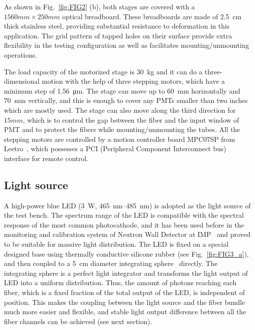 \documentclass{nst}
\begin{document}
As shown in Fig.~\ref{fig:FIG2} (b), both stages are covered with a $1560mm\times250mm$ optical breadboard. 
These breadboards are made of \SI{2.5}{cm} thick stainless steel, providing substantial resistance to deformation in this application. 
The grid pattern of tapped holes on their surface provide extra flexibility in the testing configuration as well as facilitates mounting/unmounting operations.

The load capacity of the motorized stage is \SI{30}{\kilo\gram} and it can do a three-dimensional motion with the help of three stepping motors, which have a minimum step of \SI{1.56}{\micro\meter}.
The stage can move up to \SI{60}{\milli\meter} horizontally and \SI{70}{\milli\meter} vertically, and this is enough to cover any PMTs smaller than two inches which are mostly used.
The stage can also move along the third direction for $15mm$, which is to control the gap between the fiber and the input window of PMT and to protect the fibers while mounting/unmounting the tubes.
All the stepping motors are controlled by a motion controller board MPC07SP from Leetro~\cite{leetro}, which possesses a PCI (Peripheral Component Interconnect bus) interface for remote control.

\subsection{Light source}
\label{sec:light_source}

A high-power blue LED (\SI{3}{\watt}, \SIrange{465}{485}{\nano\meter}) is adopted as the light source of the test bench.
The spectrum range of the LED is compatible with the spectral response of the most common photocathode, and it has been used before in the monitoring and calibration system of Neutron Wall Detector at IMP~\cite{yuyuhong_led} and proved to be suitable for massive light distribution.
The LED is fixed on a special designed base using thermally conductive silicone rubber (see Fig.~\ref{fig:FIG3_a}), and then coupled to a \SI{5}{\centi\meter} diameter integrating sphere~\cite{integrating_sphere} directly.
The integrating sphere is a perfect light integrator and transforms the light output of LED into a uniform distribution.
Thus, the amount of photons reaching each fiber, which is a fixed fraction of the total output of the LED, is independent of position.
This makes the coupling between the light source and the fiber bundle much more easier and flexible, and stable light output difference between all the fiber channels can be achieved (see next section).
\end{document}
